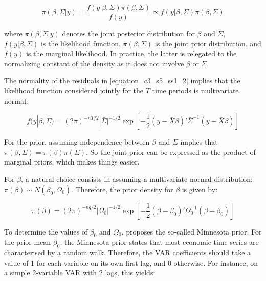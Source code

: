 \begin{equation}
\pi(\beta, \Sigma| y) = \frac{f(y|\beta, \Sigma) \pi(\beta, \Sigma)}{f(y)}
\propto f(y|\beta, \Sigma) \pi(\beta, \Sigma)
\label{equation_c3_s5_1}
\end{equation}

where $\pi(\beta, \Sigma| y)$ denotes the joint posterior distribution for $\beta$ and $\Sigma$, $f(y|\beta, \Sigma)$ is the likelihood function, $\pi(\beta, \Sigma)$ is the joint prior distribution, and $f(y)$ is the marginal likelihood. In practice, the latter is relegated to the normalizing constant of the density as it does not involve $\beta$ or $\Sigma$.

The normality of the residuals in \ref{equation_c3_s5_ss1_2} implies that the likelihood function considered jointly for the $T$ time periods is multivariate normal:

\begin{equation}
f(y| \beta, \Sigma) = (2 \pi)^{-nT/2} |\bar{\Sigma}|^{-1/2} \exp \left[ -\frac{1}{2} (y-\bar{X} \beta)' \bar{\Sigma}^{-1} (y-\bar{X} \beta) \right]
\label{equation_c3_s5_2}
\end{equation}

For the prior, assuming independence between $\beta$ and $\Sigma$ implies that $\pi(\beta, \Sigma) = \pi(\beta) \pi(\Sigma)$. So the joint prior can be expressed as the product of marginal priors, which makes things easier.

For $\beta$, a natural choice consists in assuming a multivariate normal distribution: $\pi(\beta) \sim N(\beta_0, \Omega_0)$. Therefore, the prior density for $\beta$ is given by:

\begin{equation}
\pi(\beta) = (2 \pi)^{-nq/2} |\Omega_0|^{-1/2} \exp \left[ -\frac{1}{2} (\beta - \beta_0)' \Omega_0^{-1} (\beta - \beta_0) \right]
\label{equation_c3_s5_3}
\end{equation}

To determine the values of $\beta_0$ and $\Omega_0$, \cite{Litterman1986} proposes the so-called Minnesota prior. For the prior mean $\beta_0$, the Minnesota prior states that most economic time-series are characterised by a random walk. Therefore, the VAR coefficients should take a value of 1 for each variable on its own first lag, and 0 otherwise. For instance, on a simple 2-variable VAR with 2 lags, this yields:

\newpage

